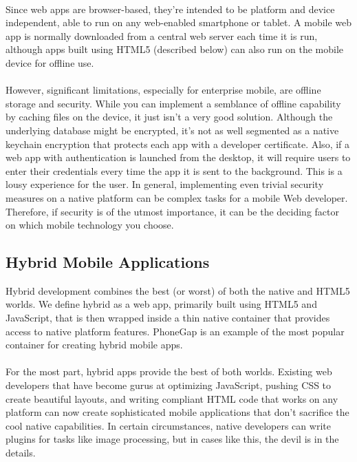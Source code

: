 \paragraph{}

Since web apps are browser-based, they’re intended to be platform and device independent, able to run on any web-enabled smartphone or tablet. A mobile web app is normally downloaded from a central web server each time it is run, although apps built using HTML5 (described below) can also run on the mobile device for offline use.

\paragraph{}
However, significant limitations, especially for enterprise mobile, are offline storage and security. While you can implement a semblance of offline capability by caching files on the device, it just isn't a very good solution. Although the underlying database might be encrypted, it’s not as well segmented as a native keychain encryption that protects each app with a developer certificate. Also, if a web app with authentication is launched from the desktop, it will require users to enter their credentials every time the app it is sent to the background. This is a lousy experience for the user. In general, implementing even trivial security measures on a native platform can be complex tasks for a mobile Web developer. Therefore, if security is of the utmost importance, it can be the deciding factor on which mobile technology you choose.



\subsection{Hybrid Mobile Applications}

Hybrid development combines the best (or worst) of both the native and HTML5 worlds. We define hybrid as a web app, primarily built using HTML5 and JavaScript, that is then wrapped inside a thin native container that provides access to native platform features. PhoneGap is an example of the most popular container for creating hybrid mobile apps.

\paragraph{}
For the most part, hybrid apps provide the best of both worlds. Existing web developers that have become gurus at optimizing JavaScript, pushing CSS to create beautiful layouts, and writing compliant HTML code that works on any platform can now create sophisticated mobile applications that don’t sacrifice the cool native capabilities. In certain circumstances, native developers can write plugins for tasks like image processing, but in cases like this, the devil is in the details.

